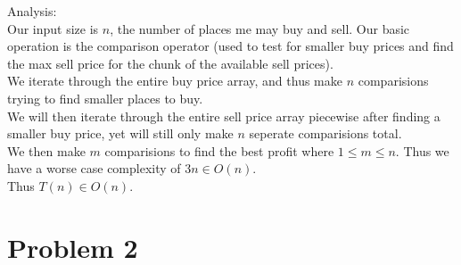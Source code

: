 \documentclass[12pt]{article}
\begin{document}
Analysis:
\\
Our input size is $n$, the number of places me may buy and sell.  Our basic operation is the comparison operator (used to test for smaller buy prices and find the max sell price for the
chunk of the available sell prices).  \\
We iterate through the entire buy price array, and thus make $n$ comparisions trying to find smaller places to buy. \\
We will then iterate through the entire sell price array piecewise after finding a smaller buy price, yet will still only make $n$ seperate comparisions total.\\
We then make $m$ comparisions to find the best profit where $1 \leq m \leq n$.  Thus we have a worse case complexity of $3n \in O(n)$.\\
Thus $T(n) \in O(n)$.

\section{Problem 2}
\end{document}
